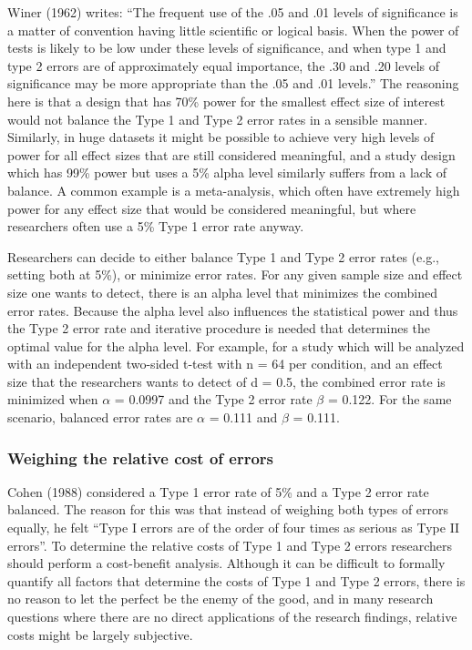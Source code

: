 \documentclass[,jou,floatsintext]{apa6}
\begin{document}
Winer (1962) writes: \enquote{The frequent use of the .05 and .01 levels of significance is a matter of convention having little scientific or logical basis. When the power of tests is likely to be low under these levels of significance, and when type 1 and type 2 errors are of approximately equal importance, the .30 and .20 levels of significance may be more appropriate than the .05 and .01 levels.} The reasoning here is that a design that has 70\% power for the smallest effect size of interest would not balance the Type 1 and Type 2 error rates in a sensible manner. Similarly, in huge datasets it might be possible to achieve very high levels of power for all effect sizes that are still considered meaningful, and a study design which has 99\% power but uses a 5\% alpha level similarly suffers from a lack of balance. A common example is a meta-analysis, which often have extremely high power for any effect size that would be considered meaningful, but where researchers often use a 5\% Type 1 error rate anyway.

Researchers can decide to either balance Type 1 and Type 2 error rates (e.g., setting both at 5\%), or minimize error rates. For any given sample size and effect size one wants to detect, there is an alpha level that minimizes the combined error rates. Because the alpha level also influences the statistical power and thus the Type 2 error rate and iterative procedure is needed that determines the optimal value for the alpha level. For example, for a study which will be analyzed with an independent two-sided t-test with n = 64 per condition, and an effect size that the researchers wants to detect of d = 0.5, the combined error rate is minimized when \(\alpha\) = 0.0997 and the Type 2 error rate \(\beta\) = 0.122. For the same scenario, balanced error rates are \(\alpha\) = 0.111 and \(\beta\) = 0.111.

\hypertarget{weighing-the-relative-cost-of-errors}{%
\subsubsection{Weighing the relative cost of errors}\label{weighing-the-relative-cost-of-errors}}

Cohen (1988) considered a Type 1 error rate of 5\% and a Type 2 error rate balanced. The reason for this was that instead of weighing both types of errors equally, he felt \enquote{Type I errors are of the order of four times as serious as Type II errors}. To determine the relative costs of Type 1 and Type 2 errors researchers should perform a cost-benefit analysis. Although it can be difficult to formally quantify all factors that determine the costs of Type 1 and Type 2 errors, there is no reason to let the perfect be the enemy of the good, and in many research questions where there are no direct applications of the research findings, relative costs might be largely subjective.
\end{document}
